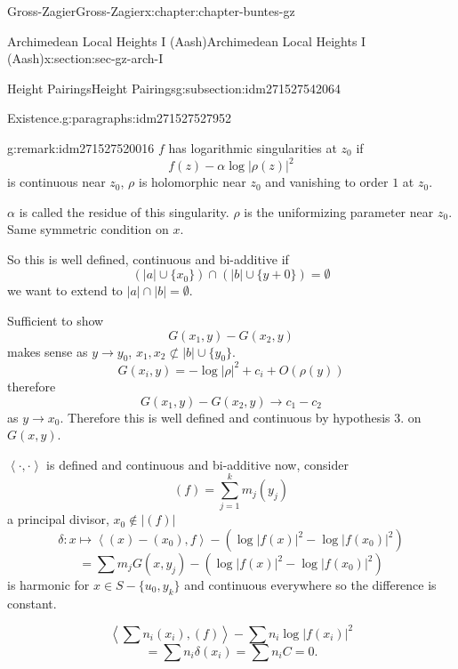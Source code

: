 \documentclass[oneside,10pt,]{book}
\numberwithin{equation}{section}
\newcommand{\pair}[2]{\left\langle #1, #2 \right\rangle}
\begin{document}
\begin{chapterptx}{Gross-Zagier}{}{Gross-Zagier}{}{}{x:chapter:chapter-buntes-gz}
\begin{sectionptx}{Archimedean Local Heights I (Aash)}{}{Archimedean Local Heights I (Aash)}{}{}{x:section:sec-gz-arch-I}
\begin{subsectionptx}{Height Pairings}{}{Height Pairings}{}{}{g:subsection:idm271527542064}
\begin{paragraphs}{Existence.}{g:paragraphs:idm271527527952}
\begin{remark}{}{g:remark:idm271527520016}
\(f\) has logarithmic singularities at \(z_0\) if%
\begin{equation*}
f(z) - \alpha \log|\rho (z)|^2
\end{equation*}
is continuous near \(z_0\), \(\rho \) is holomorphic near \(z_0\) and vanishing to order \(1\) at \(z_0\).%
\par
\(\alpha \) is called the residue of this singularity. \(\rho \) is the uniformizing parameter near \(z_0\). Same symmetric condition on \(x\).%
\end{remark}
So this is well defined, continuous and bi-additive if%
\begin{equation*}
(|a| \cup\{x_0\}) \cap (|b| \cup \{y+0\} ) = \emptyset
\end{equation*}
we want to extend to \(|a|\cap |b| = \emptyset\).%
\par
Sufficient to show%
\begin{equation*}
G(x_1,y) -G(x_2,y)
\end{equation*}
makes sense as \(y\to y_0\), \(x_1, x_2 \not \subset |b| \cup\{y_0\}\).%
\begin{equation*}
G(x_i, y) = - \log|\rho |^2 + c_i + O(\rho (y))
\end{equation*}
therefore%
\begin{equation*}
G(x_1,y) - G(x_2,y) \to c_1  - c_2
\end{equation*}
as \(y \to x_0\). Therefore this is well defined and continuous by hypothesis 3. on \(G(x,y)\).%
\par
\(\pair\cdot\cdot\) is defined and continuous and bi-additive now, consider%
\begin{equation*}
(f) = \sum_{j=1}^ k m_j (y_j)
\end{equation*}
a principal divisor, \(x_0 \not \in |(f)|\)%
\begin{equation*}
\delta \colon x\mapsto \pair {(x) - (x_0) }{f} - \left(\log|f(x)|^2 - \log|f(x_0)|^2\right)
\end{equation*}
%
\begin{equation*}
= \sum m_j G(x,y_j) - \left( \log|f(x)| ^2 - \log|f(x_0)|^2\right)
\end{equation*}
is harmonic for \(x \in S - \{u_0, y_k\}\) and continuous everywhere so the difference is constant.%
\par
%
\begin{equation*}
\pair {\sum n_i(x_i)}{(f)} - \sum n_i \log|f(x_i)|^2
\end{equation*}
%
\begin{equation*}
=\sum n_i \delta (x_i) = \sum n_i C = 0\text{.}

\end{equation*}
\end{paragraphs}
\end{subsectionptx}
\end{sectionptx}
\end{chapterptx}
\end{document}

